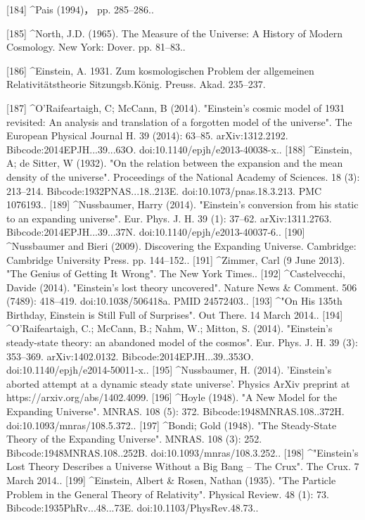 [184]
^Pais (1994)， pp. 285–286..

[185]
^North, J.D. (1965). The Measure of the Universe: A History of Modern Cosmology. New York: Dover. pp. 81–83..

[186]
^Einstein, A. 1931. Zum kosmologischen Problem der allgemeinen Relativitätstheorie Sitzungsb.König. Preuss. Akad. 235–237.

[187]
^O'Raifeartaigh, C; McCann, B (2014). "Einstein's cosmic model of 1931 revisited: An analysis and translation of a forgotten model of the universe". The European Physical Journal H. 39 (2014): 63–85. arXiv:1312.2192. Bibcode:2014EPJH...39...63O. doi:10.1140/epjh/e2013-40038-x..
[188]
^Einstein, A; de Sitter, W (1932). "On the relation between the expansion and the mean density of the universe". Proceedings of the National Academy of Sciences. 18 (3): 213–214. Bibcode:1932PNAS...18..213E. doi:10.1073/pnas.18.3.213. PMC 1076193..
[189]
^Nussbaumer, Harry (2014). "Einstein's conversion from his static to an expanding universe". Eur. Phys. J. H. 39 (1): 37–62. arXiv:1311.2763. Bibcode:2014EPJH...39...37N. doi:10.1140/epjh/e2013-40037-6..
[190]
^Nussbaumer and Bieri (2009). Discovering the Expanding Universe. Cambridge: Cambridge University Press. pp. 144–152..
[191]
^Zimmer, Carl (9 June 2013). "The Genius of Getting It Wrong". The New York Times..
[192]
^Castelvecchi, Davide (2014). "Einstein's lost theory uncovered". Nature News & Comment. 506 (7489): 418–419. doi:10.1038/506418a. PMID 24572403..
[193]
^"On His 135th Birthday, Einstein is Still Full of Surprises". Out There. 14 March 2014..
[194]
^O'Raifeartaigh, C.; McCann, B.; Nahm, W.; Mitton, S. (2014). "Einstein's steady-state theory: an abandoned model of the cosmos". Eur. Phys. J. H. 39 (3): 353–369. arXiv:1402.0132. Bibcode:2014EPJH...39..353O. doi:10.1140/epjh/e2014-50011-x..
[195]
^Nussbaumer, H. (2014). 'Einstein’s aborted attempt at a dynamic steady state universe’. Physics ArXiv preprint at https://arxiv.org/abs/1402.4099.
[196]
^Hoyle (1948). "A New Model for the Expanding Universe". MNRAS. 108 (5): 372. Bibcode:1948MNRAS.108..372H. doi:10.1093/mnras/108.5.372..
[197]
^Bondi; Gold (1948). "The Steady-State Theory of the Expanding Universe". MNRAS. 108 (3): 252. Bibcode:1948MNRAS.108..252B. doi:10.1093/mnras/108.3.252..
[198]
^"Einstein's Lost Theory Describes a Universe Without a Big Bang – The Crux". The Crux. 7 March 2014..
[199]
^Einstein, Albert & Rosen, Nathan (1935). "The Particle Problem in the General Theory of Relativity". Physical Review. 48 (1): 73. Bibcode:1935PhRv...48...73E. doi:10.1103/PhysRev.48.73..
